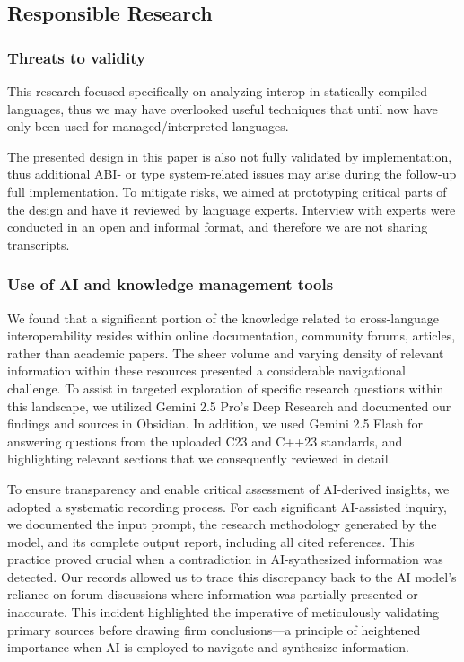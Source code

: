 \subsection{Responsible Research}
\subsubsection{Threats to validity}
This research focused specifically on analyzing interop in statically compiled languages, thus we may have overlooked useful techniques that until now have only been used for managed/interpreted languages.

The presented design in this paper is also not fully validated by implementation, thus additional ABI- or type system-related issues may arise during the follow-up full implementation. To mitigate risks, we aimed at prototyping critical parts of the design and have it reviewed by language experts. Interview with experts were conducted in an open and informal format, and therefore we are not sharing transcripts.

\subsubsection{Use of AI and knowledge management tools}
We found that a significant portion of the knowledge related to cross-language interoperability resides within online documentation, community forums, articles, rather than academic papers. The sheer volume and varying density of relevant information within these resources presented a considerable navigational challenge. To assist in targeted exploration of specific research questions within this landscape, we utilized Gemini 2.5 Pro's Deep Research and documented our findings and sources in Obsidian. In addition, we used Gemini 2.5 Flash for answering questions from the uploaded C23 and C++23 standards, and highlighting relevant sections that we consequently reviewed in detail.

To ensure transparency and enable critical assessment of AI-derived insights, we adopted a systematic recording process. For each significant AI-assisted inquiry, we documented the input prompt, the research methodology generated by the model, and its complete output report, including all cited references. This practice proved crucial when a contradiction in AI-synthesized information was detected. Our records allowed us to trace this discrepancy back to the AI model's reliance on forum discussions where information was partially presented or inaccurate. This incident highlighted the imperative of meticulously validating primary sources before drawing firm conclusions—a principle of heightened importance when AI is employed to navigate and synthesize information.

